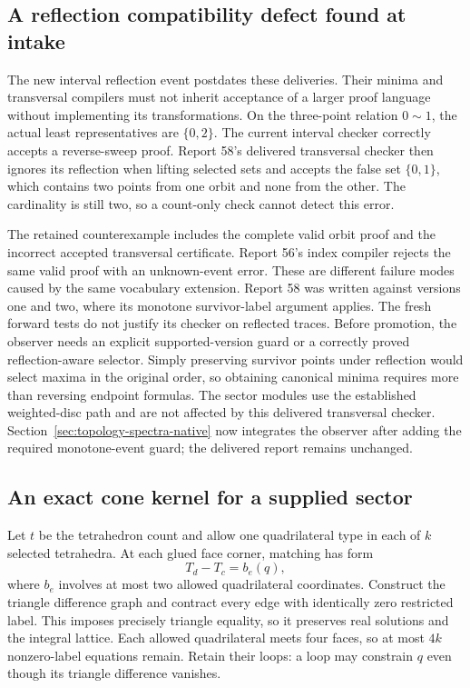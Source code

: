 \subsection{A reflection compatibility defect found at intake}

The new interval reflection event postdates these deliveries. Their minima
and transversal compilers must not inherit acceptance of a larger proof
language without implementing its transformations. On the three-point
relation $0\sim1$, the actual least representatives are $\{0,2\}$. The
current interval checker correctly accepts a reverse-sweep proof. Report
58's delivered transversal checker then ignores its reflection when lifting
selected sets and accepts the false set $\{0,1\}$, which contains two points
from one orbit and none from the other. The cardinality is still two, so a
count-only check cannot detect this error.

The retained counterexample includes the complete valid orbit proof and
the incorrect accepted transversal certificate. Report 56's index compiler
rejects the same valid proof with an unknown-event error. These are different
failure modes caused by the same vocabulary extension. Report 58 was written
against versions one and two, where its monotone survivor-label argument
applies. The fresh forward tests do not justify its checker on reflected
traces. Before promotion, the observer needs an explicit supported-version
guard or a correctly proved reflection-aware selector. Simply preserving
survivor points under reflection would select maxima in the original order,
so obtaining canonical minima requires more than reversing endpoint formulas.
The sector modules use the established weighted-disc path and are not affected
by this delivered transversal checker.
Section~\ref{sec:topology-spectra-native} now integrates the observer after
adding the required monotone-event guard; the delivered report remains unchanged.

\subsection{An exact cone kernel for a supplied sector}

Let $t$ be the tetrahedron count and allow one quadrilateral type in each
of $k$ selected tetrahedra. At each glued face corner, matching has form
\[
 T_d-T_c=b_e(q),
\]
where $b_e$ involves at most two allowed quadrilateral coordinates. Construct
the triangle difference graph and contract every edge with identically zero
restricted label. This imposes precisely triangle equality, so it preserves
real solutions and the integral lattice. Each allowed quadrilateral meets
four faces, so at most $4k$ nonzero-label equations remain. Retain their
loops: a loop may constrain $q$ even though its triangle difference vanishes.

